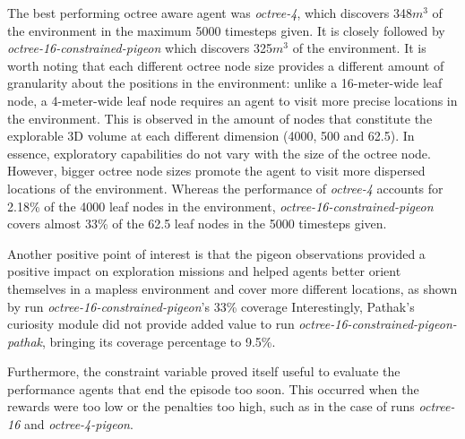         The best performing octree aware agent was \textit{octree-4}, which discovers 348$m^3$ of the environment in the maximum 5000 timesteps given. It is closely followed by \textit{octree-16-constrained-pigeon} which discovers 325$m^3$ of the environment. 
        It is worth noting that each different octree node size provides a different amount of granularity about the positions in the environment: unlike a 16-meter-wide leaf node, a 4-meter-wide leaf node requires an agent to visit more precise locations in the environment.
        This is observed in the amount of nodes that constitute the explorable 3D volume at each different dimension (4000, 500 and 62.5). 
        In essence, exploratory capabilities do not vary with the size of the octree node. However, bigger octree node sizes promote the agent to visit more dispersed locations of the environment.
        Whereas the performance of \textit{octree-4} accounts for 2.18\% of the 4000 leaf nodes in the environment,  \textit{octree-16-constrained-pigeon} covers almost 33\% of the 62.5 leaf nodes in the 5000 timesteps given. 
        

               
        
        Another positive point of interest is that the pigeon observations provided a positive impact on exploration missions and helped agents better orient themselves in a mapless environment and cover more different locations, as shown by run \textit{octree-16-constrained-pigeon}'s 33\% coverage 
        Interestingly, Pathak's curiosity module did not provide added value to run \textit{octree-16-constrained-pigeon-pathak}, bringing its coverage percentage to 9.5\%.
        
        Furthermore, the constraint variable proved itself useful to evaluate the performance agents that end the episode too soon. This occurred when the rewards were too low or the penalties too high, such as in the case of runs  \textit{octree-16} and \textit{octree-4-pigeon}. 

